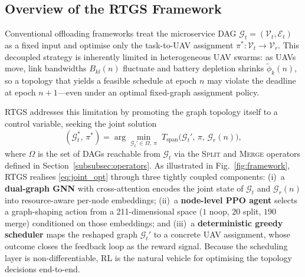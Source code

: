 
\subsection{Overview of the RTGS Framework}
\label{subsec:overview}

Conventional offloading frameworks treat the microservice DAG
$\mathcal{G}_t = (\mathcal{V}_t, \mathcal{E}_t)$ as a fixed input
and optimise only the task-to-UAV assignment
$\pi^*: \mathcal{V}_t \to \mathcal{V}_r$.
This decoupled strategy is inherently limited in heterogeneous UAV
swarms: as UAVs move, link bandwidths $B_{kl}(n)$ fluctuate and
battery depletion shrinks $\tilde{\phi}_k(n)$, so a topology that
yields a feasible schedule at epoch $n$ may violate the deadline at
epoch $n{+}1$—even under an optimal fixed-graph assignment policy.

RTGS addresses this limitation by promoting the graph topology itself
to a control variable, seeking the joint solution
\begin{equation}
  (\mathcal{G}_t^{\ast},\,\pi^{\ast}) =
  \arg\min_{\mathcal{G}_t' \in \Omega,\;\pi}\;
  T_{\mathrm{span}}\!\bigl(\mathcal{G}_t',\,\pi,\,\mathcal{G}_r(n)\bigr),
  \label{eq:joint_opt}
\end{equation}
where $\Omega$ is the set of DAGs reachable from $\mathcal{G}_t$ via
the \textsc{Split} and \textsc{Merge} operators defined in
Section~\ref{subsubsec:operators}.
As illustrated in Fig.~\ref{fig:framework}, RTGS realises
\eqref{eq:joint_opt} through three tightly coupled components:
(i)~a \textbf{dual-graph GNN} with cross-attention encodes the
joint state of $\mathcal{G}_t$ and $\mathcal{G}_r(n)$ into
resource-aware per-node embeddings;
(ii)~a \textbf{node-level PPO agent} selects a graph-shaping action
from a 211-dimensional space ($1$ noop, $20$ split, $190$ merge)
conditioned on those embeddings;
and (iii)~a \textbf{deterministic greedy scheduler} maps the
reshaped graph $\mathcal{G}_t'$ to a concrete UAV assignment,
whose outcome closes the feedback loop as the reward signal.
Because the scheduling layer is non-differentiable, RL is the
natural vehicle for optimising the topology decisions end-to-end.
